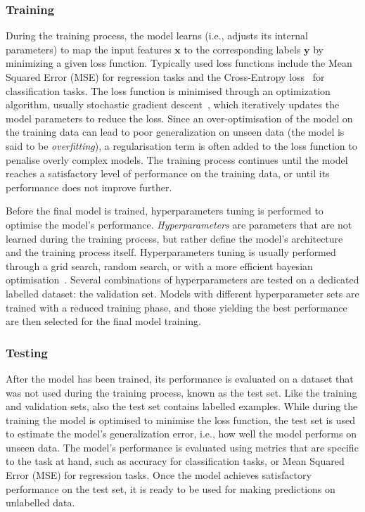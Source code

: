 \subsubsection{Training}
During the training process, the model learns (i.e., adjusts its internal parameters) to map the input features $\mathbf{x}$ to the corresponding labels $\mathbf{y}$ by minimizing a given loss function. Typically used loss functions include the Mean Squared Error (MSE) for regression tasks and the Cross-Entropy loss~\cite{mao2023cross} for classification tasks. The loss function is minimised through an optimization algorithm, usually stochastic gradient descent~\cite{10.1214/aoms/1177729392}, which iteratively updates the model parameters to reduce the loss. Since an over-optimisation of the model on the training data can lead to poor generalization on unseen data (the model is said to be \emph{overfitting}), a regularisation term is often added to the loss function to penalise overly complex models. The training process continues until the model reaches a satisfactory level of performance on the training data, or until its performance does not improve further. 

Before the final model is trained, hyperparameters tuning is performed to optimise the model's performance. \emph{Hyperparameters} are parameters that are not learned during the training process, but rather define the model's architecture and the training process itself. Hyperparameters tuning is usually performed through a grid search, random search, or with a more efficient bayesian optimisation~\cite{frazier2018tutorial,snoek2012practical,mockus2005bayesian}. Several combinations of hyperparameters are tested on a dedicated labelled dataset: the validation set. Models with different hyperparameter sets are trained with a reduced training phase, and those yielding the best performance are then selected for the final model training.

\subsubsection{Testing}
After the model has been trained, its performance is evaluated on a dataset that was not used during the training process, known as the test set. Like the training and validation sets, also the test set contains labelled examples. While during the training the model is optimised to minimise the loss function, the test set is used to estimate the model's generalization error, i.e., how well the model performs on unseen data. The model's performance is evaluated using metrics that are specific to the task at hand, such as accuracy for classification tasks, or Mean Squared Error (MSE) for regression tasks. Once the model achieves satisfactory performance on the test set, it is ready to be used for making predictions on unlabelled data.

